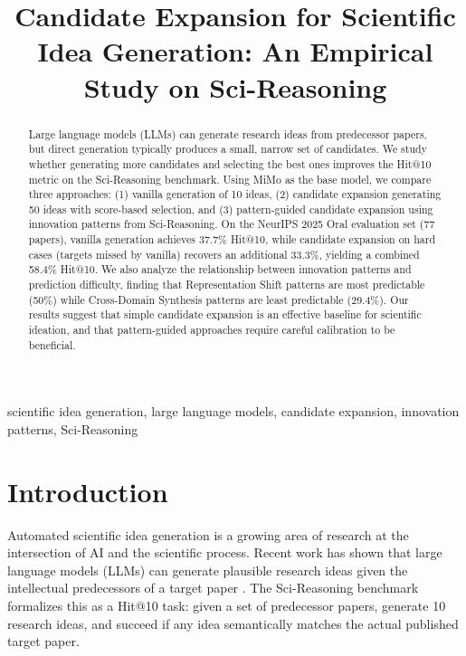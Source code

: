 \documentclass[conference]{IEEEtran}
\begin{document}
\title{Candidate Expansion for Scientific Idea Generation: An Empirical Study on Sci-Reasoning}

\author{
}

\maketitle

\begin{abstract}
Large language models (LLMs) can generate research ideas from predecessor papers, but direct generation typically produces a small, narrow set of candidates. We study whether generating more candidates and selecting the best ones improves the Hit@10 metric on the Sci-Reasoning benchmark. Using MiMo as the base model, we compare three approaches: (1) vanilla generation of 10 ideas, (2) candidate expansion generating 50 ideas with score-based selection, and (3) pattern-guided candidate expansion using innovation patterns from Sci-Reasoning. On the NeurIPS 2025 Oral evaluation set (77 papers), vanilla generation achieves 37.7\% Hit@10, while candidate expansion on hard cases (targets missed by vanilla) recovers an additional 33.3\%, yielding a combined 58.4\% Hit@10. We also analyze the relationship between innovation patterns and prediction difficulty, finding that Representation Shift patterns are most predictable (50\%) while Cross-Domain Synthesis patterns are least predictable (29.4\%). Our results suggest that simple candidate expansion is an effective baseline for scientific ideation, and that pattern-guided approaches require careful calibration to be beneficial.
\end{abstract}

\begin{IEEEkeywords}
scientific idea generation, large language models, candidate expansion, innovation patterns, Sci-Reasoning
\end{IEEEkeywords}

\section{Introduction}

Automated scientific idea generation is a growing area of research at the intersection of AI and the scientific process. Recent work has shown that large language models (LLMs) can generate plausible research ideas given the intellectual predecessors of a target paper \cite{liu2025scireasoning}. The Sci-Reasoning benchmark formalizes this as a Hit@10 task: given a set of predecessor papers, generate 10 research ideas, and succeed if any idea semantically matches the actual published target paper.
\end{document}
